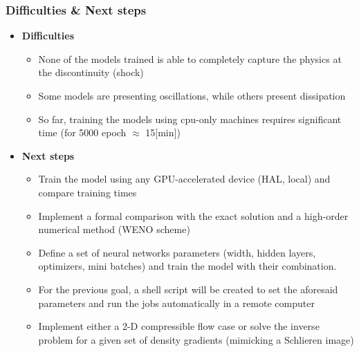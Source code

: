 \documentclass[aspectratio=169]{beamer}
\begin{document}
\begin{frame}\frametitle{Difficulties \& Next steps}

\begin{itemize}
	\item \textbf{\textcolor{myOrange}{Difficulties}}
		
		\begin{itemize}
			\item None of the models trained is able to completely capture the physics at the discontinuity (shock)
			\item Some models are presenting oscillations, while others present dissipation 
			\item So far, training the models using cpu-only machines requires significant time (for 5000 epoch $\approx$ 15[min])
		\end{itemize}
	
	\vspace{3mm}
	
	\item \textbf{\textcolor{myOrange}{Next steps}}
	
	\begin{itemize}
		\item Train the model using any GPU-accelerated device (HAL, local) and compare training times
		\item Implement a formal comparison with the exact solution and a high-order numerical method (WENO scheme)
		\item Define a set of neural networks parameters (width, hidden layers, optimizers, mini batches) and train the model with
		their combination. 
		\item For the previous goal, a shell script will be created to set the aforesaid parameters and run the jobs automatically
		in a remote computer		
		\item Implement either a 2-D compressible flow case or solve the inverse problem for a given set of density gradients (mimicking a Schlieren image)
	\end{itemize}
	
	
\end{itemize}




\end{frame}
\end{document}
